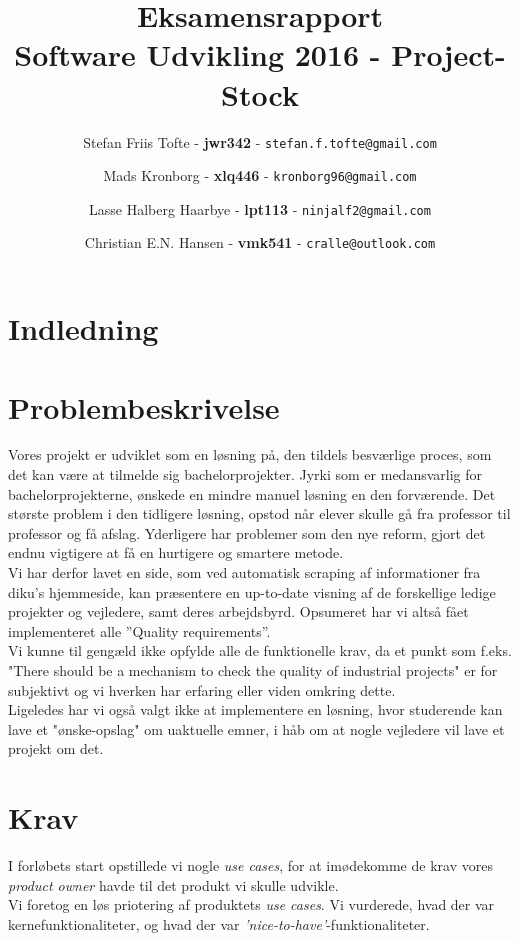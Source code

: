 \documentclass[12pt]{article}
\title{
  \vspace{3cm}
  \Huge{Eksamensrapport} \\
  \Large{Software Udvikling 2016 - Project-Stock}
	}
\author{
	\Large{Stefan Friis Tofte} - \textbf{jwr342} - \texttt{stefan.f.tofte@gmail.com}
	\and
	\Large{Mads Kronborg} - \textbf{xlq446} - \texttt{kronborg96@gmail.com}
	\and
	\Large{Lasse Halberg Haarbye} - \textbf{lpt113} - \texttt{ninjalf2@gmail.com}
	\and
	\Large{Christian E.N. Hansen} - \textbf{vmk541} - \texttt{cralle@outlook.com}
}
\def \ColourPDF {../include/ku-farve}
\def \TitlePDF {../include/ku-en}  %
\begin{document}


\clearpage\maketitle
\thispagestyle{empty}

\newpage
\tableofcontents
\newpage

\section{Indledning}
\label{sec:indledning}

\section{Problembeskrivelse}
\label{sec:problem}
Vores projekt er udviklet som en løsning på, den tildels besværlige proces, som det kan være at tilmelde sig bachelorprojekter. Jyrki som er medansvarlig for bachelorprojekterne, ønskede en mindre manuel løsning en den forværende. Det største problem i den tidligere løsning, opstod når elever skulle gå fra professor til professor og få afslag. Yderligere har problemer som den nye reform, gjort det endnu vigtigere at få en hurtigere og smartere metode. \\
Vi har derfor lavet en side, som ved automatisk scraping af informationer fra diku's hjemmeside, kan præsentere en up-to-date visning af de forskellige ledige projekter og vejledere, samt deres arbejdsbyrd. Opsumeret har vi altså fået implementeret alle ''Quality requirements''. \\
Vi kunne til gengæld ikke opfylde alle de funktionelle krav, da et punkt som f.eks. "There should be a mechanism to check the quality of industrial projects" er for subjektivt og vi hverken har erfaring eller viden omkring dette. \\
Ligeledes har vi også valgt ikke at implementere en løsning, hvor studerende kan lave et "ønske-opslag" om uaktuelle emner, i håb om at nogle vejledere vil lave et projekt om det.


\section{Krav}
\label{sec:krav}
I forløbets start opstillede vi nogle \textit{use cases}, for at imødekomme de krav vores \textit{product owner} havde til det produkt vi skulle udvikle. \\
Vi foretog en løs priotering af produktets \textit{use cases}. Vi vurderede, hvad der var kernefunktionaliteter, og hvad der var \textit{'nice-to-have'}-funktionaliteter.
\end{document}
